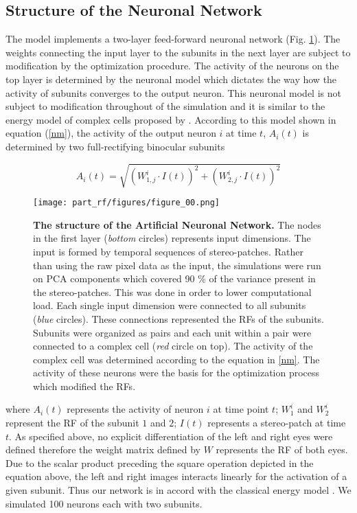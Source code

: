 \subsection{Structure of the Neuronal Network} 

The model implements a two-layer feed-forward neuronal network (Fig.
\ref{net}). The weights connecting the input layer to the subunits in the
next layer are subject to modification by the optimization procedure. The
activity of the neurons on the top layer is determined by the neuronal
model which dictates the way how the activity of subunits converges to the
output neuron. This neuronal model is not subject to modification
throughout of the simulation and it is similar to the energy model of
complex cells proposed by \citet{ohzawa1990a}. According to this model
shown in equation (\ref{nm}), the activity of the output neuron $i$ at time
$t$, $A_i(t)$ is determined by two full-rectifying binocular subunits


\begin{equation} A_{i}(t) = \sqrt{(W^i_{1,j} \cdot I(t))^2 +
(W^i_{2,j}\cdot I(t))^2 } \label{nm} \end{equation} 



\begin{figure}[!htb] 
\centerline{ \texttt{[image: part\_rf/figures/figure\_00.png]}} 

\caption[The Structure of the Artificial Neuronal Network.]
{\textbf{The structure of the Artificial Neuronal Network.} The nodes in the first layer
(\textit{bottom} circles) represents input dimensions. The input is formed
by temporal sequences of stereo-patches. Rather than using the raw pixel
data as the input, the simulations were run on PCA components which covered
90 \% of the variance present in the stereo-patches. This was done in order
to lower computational load. Each single input dimension were connected to
all subunits (\textit{blue} circles). These connections represented the RFs
of the subunits. Subunits were organized as pairs and each unit within a
pair were connected to a complex cell (\textit{red} circle on top). The
activity of the complex cell was determined according to the equation in
\ref{nm}. The activity of these neurons were the basis for the optimization
process which modified the RFs.} 
\label{net} 

\end{figure} 


where $A_{i}(t)$ represents the activity of neuron $i$ at time point $t$;
$W^i_1$ and $W^i_2$ represent the RF of the subunit $1$ and $2$; $I(t)$
represents a stereo-patch at time $t$. As specified above, no explicit
differentiation of the left and right eyes were defined therefore the
weight matrix defined by $W$ represents the RF of both eyes. Due to the
scalar product preceding the square operation depicted in the equation
above, the left and right images interacts linearly for the activation of a
given subunit. Thus our network is in accord with the classical energy
model \citet{ohzawa1990a}. We simulated 100 neurons each with two
subunits.
	
